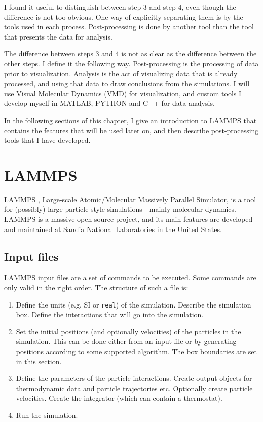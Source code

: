 I found it useful to distinguish between step 3 and step 4, even though the difference is not too obvious. One way of explicitly separating them is by the tools used in each process. Post-processing is done by another tool than the tool that presents the data for analysis. 

The difference between steps 3 and 4 is not as clear as the difference between the other steps. I define it the following way. Post-processing is the processing of data prior to visualization. Analysis is the act of visualizing data that is already processed, and using that data to draw conclusions from the simulations. I will use Visual Molecular Dynamics (VMD) \cite{HUMP96} for visualization, and custom tools I develop myself in MATLAB, PYTHON and C++ for data analysis.

In the following sections of this chapter, I give an introduction to LAMMPS that contains the features that will be used later on, and then describe post-processing tools that I have developed. 

\section{LAMMPS}
LAMMPS \cite{Plimpton1995}, Large-scale Atomic/Molecular Massively Parallel Simulator, is a tool for (possibly) large particle-style simulations - mainly molecular dynamics. LAMMPS is a massive open source project, and its main features are developed and maintained at Sandia National Laboratories in the United States. 

\subsection{Input files}
LAMMPS input files are a set of commands to be executed. Some commands are only valid in the right order. The structure of such a file is:

\begin{enumerate}
\item {} Define the units (e.g. SI or {\tt real}) of the simulation. Describe the simulation box. Define the interactions that will go into the simulation. 
\item {} Set the initial positions (and optionally velocities) of the particles in the simulation. This can be done either from an input file or by generating positions according to some supported algorithm. The box boundaries are set in this section.
\item {} Define the parameters of the particle interactions. Create output objects for thermodynamic data and particle trajectories etc. Optionally create particle velocities. Create the integrator (which can contain a thermostat).
\item {} Run the simulation.
\end{enumerate}

